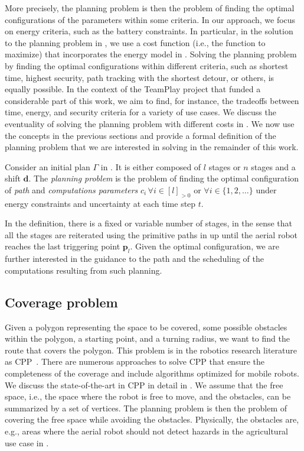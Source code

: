 More precisely, the planning problem is then the problem of finding the optimal configurations of the parameters within some criteria. In our approach, we focus on energy criteria, such as the battery constraints. In particular, in the solution to the planning problem in , we use a cost function (i.e., the function to maximize) that incorporates the energy model in . Solving the planning problem by finding the optimal configurations within different criteria, such as shortest time, highest security, path tracking with the shortest detour, or others, is equally possible. In the context of the TeamPlay project that funded a considerable part of this work, we aim to find, for instance, the tradeoffs between time, energy, and security criteria for a variety of use cases. We discuss the eventuality of solving the planning problem with different costs in . We now use the concepts in the previous sections and provide a formal definition of the planning problem that we are interested in solving in the remainder of this work.

\begin{pb}
  \label{pb}
  Consider an initial plan $\Gamma$ in . It is either composed of $l$ stages or $n$ stages and a shift $\mathbf{d}$. The \emph{planning problem} is the problem of finding the optimal configuration of \emph{path} and \emph{computations parameters} $c_i\,\forall i\in[l]_{>0}$ or $\forall i\in\{1,2,\dots\}$ under energy constraints and uncertainty at each time step $t$.
\end{pb}    

In the definition, there is a fixed or variable number of stages, in the sense that all the stages are reiterated using the primitive paths in  up until the aerial robot reaches the last triggering point $\mathbf{p}_l$. Given the optimal configuration, we are further interested in the guidance to the path and the scheduling of the computations resulting from such planning.

\subsection{Coverage problem}

Given a polygon representing the space to be covered, some possible obstacles within the polygon, a starting point, and a turning radius, we want to find the route that covers the polygon. This problem is in the robotics research literature as CPP~\citep{choset1998coverage,choset2001coverage,galceran2013survey}. There are numerous approaches to solve CPP that ensure the completeness of the coverage and include algorithms optimized for mobile robots. We discuss the state-of-the-art in CPP in detail in . We assume that the free space, i.e., the space where the robot is free to move, and the obstacles, can be summarized by a set of vertices. The planning problem is then the problem of covering the free space while avoiding the obstacles. Physically, the obstacles are, e.g., areas where the aerial robot should not detect hazards in the agricultural use case in .

